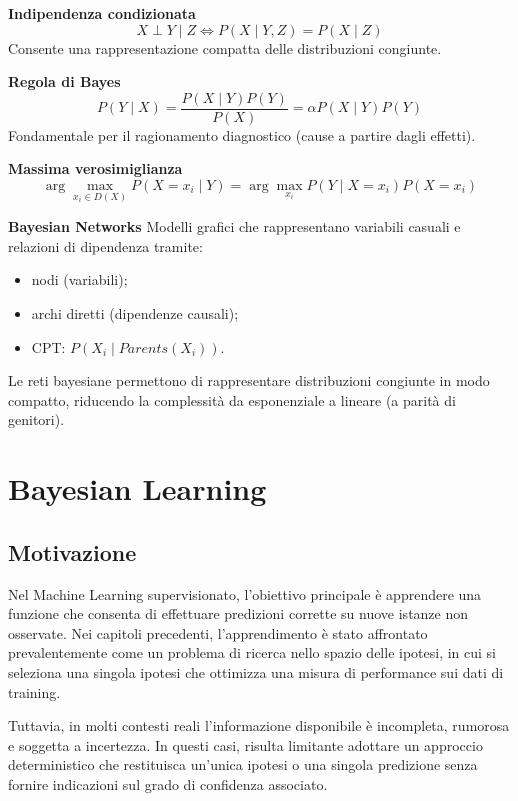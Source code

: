\documentclass[a4paper,12pt]{report}
\begin{document}
\begin{tcolorbox}[
    colback=green!10,
    colframe=green!50!black,
    boxrule=0.4pt,
    left=6pt,
    right=6pt,
    top=6pt,
    bottom=6pt,
    breakable
]
\medskip
\textbf{Indipendenza condizionata}  
\[
X \perp Y \mid Z \iff P(X \mid Y,Z) = P(X \mid Z)
\]
Consente una rappresentazione compatta delle distribuzioni congiunte.

\medskip
\textbf{Regola di Bayes}
\[
P(Y \mid X) = \frac{P(X \mid Y)P(Y)}{P(X)} = \alpha P(X \mid Y)P(Y)
\]
Fondamentale per il ragionamento diagnostico (cause a partire dagli effetti).

\medskip
\textbf{Massima verosimiglianza}
\[
\arg\max_{x_i \in D(X)} P(X=x_i \mid Y)
= \arg\max_{x_i} P(Y \mid X=x_i)P(X=x_i)
\]

\medskip
\textbf{Bayesian Networks}  
Modelli grafici che rappresentano variabili casuali e relazioni di dipendenza tramite:
\begin{itemize}
    \item nodi (variabili);
    \item archi diretti (dipendenze causali);
    \item CPT: \( P(X_i \mid Parents(X_i)) \).
\end{itemize}

Le reti bayesiane permettono di rappresentare distribuzioni congiunte in modo compatto, riducendo la complessità da esponenziale a lineare (a parità di genitori).

\end{tcolorbox}

\newpage

\chapter{Bayesian Learning}

\section{Motivazione}

Nel Machine Learning supervisionato, l’obiettivo principale è apprendere una funzione che consenta di effettuare predizioni corrette su nuove istanze non osservate.
Nei capitoli precedenti, l’apprendimento è stato affrontato prevalentemente come un problema di ricerca nello spazio delle ipotesi, in cui si seleziona una singola ipotesi che ottimizza una misura di performance sui dati di training.

Tuttavia, in molti contesti reali l’informazione disponibile è incompleta, rumorosa e soggetta a incertezza.
In questi casi, risulta limitante adottare un approccio deterministico che restituisca un’unica ipotesi o una singola predizione senza fornire indicazioni sul grado di confidenza associato.
\end{document}
